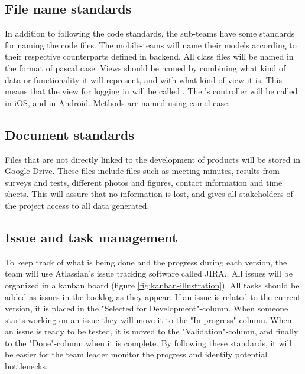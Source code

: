\subsection{File name standards}
In addition to following the code standards, the sub-teams have some standards for naming the code files. The mobile-teams will name their models according to their respective counterparts defined in backend. All class files will be named in the format of pascal case.\cite{pascal-case} Views should be named by combining what kind of data or functionality it will represent, and with what kind of view it is. This means that the view for logging in will be called . The 's controller will be called  in iOS, and  in Android. Methods are named using camel case.\cite{pascal-case}

\subsection{Document standards}
Files that are not directly linked to the development of products will be stored in Google Drive.\cite{google-drive} These files include files such as meeting minutes, results from surveys and tests, different photos and figures, contact information and time sheets. This will assure that no information is lost, and gives all stakeholders of the project access to all data generated.

\subsection{Issue and task management}
To keep track of what is being done and the progress during each version, the team will use Atlassian's issue tracking software called JIRA.\cite{jira}. All issues will be organized in a kanban board (figure \ref{fig:kanban-illustration}).\cite[p. 137]{lean-startup} All tasks should be added as issues in the \gls{backlog} as they appear. If an issue is related to the current version, it is placed in the "Selected for Development"-column. When someone starts working on an issue they will move it to the "In progress"-column. When an issue is ready to be tested, it is moved to the "Validation"-column, and finally to the "Done"-column when it is complete. By following these standards, it will be easier for the team leader monitor the progress and identify potential bottlenecks.


